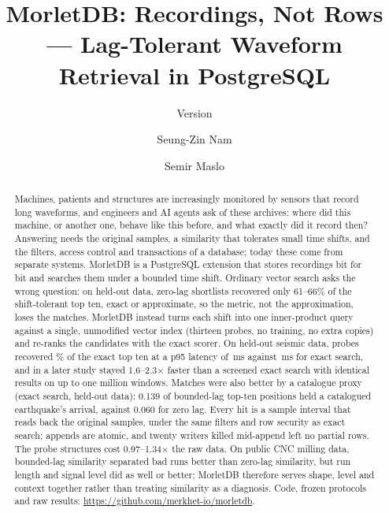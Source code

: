 \documentclass[sigconf]{acmart}
\begin{document}
\title{MorletDB: Recordings, Not Rows --- Lag-Tolerant Waveform Retrieval in PostgreSQL}
\ifdefined\SigmodSubmission\else\subtitle{Version \ReportVersion}\fi
\author{Seung-Zin Nam}
\author{Semir Maslo}

\begin{abstract}
Machines, patients and structures are increasingly monitored by sensors that record long waveforms, and engineers and AI agents ask of these archives: where did this machine, or another one, behave like this before, and what exactly did it record then? Answering needs the original samples, a similarity that tolerates small time shifts, and the filters, access control and transactions of a database; today these come from separate systems. MorletDB is a PostgreSQL extension that stores recordings bit for bit and searches them under a bounded time shift. Ordinary vector search asks the wrong question: on held-out data, zero-lag shortlists recovered only 61--66\% of the shift-tolerant top ten, exact or approximate, so the metric, not the approximation, loses the matches. MorletDB instead turns each shift into one inner-product query against a single, unmodified vector index (thirteen probes, no training, no extra copies) and re-ranks the candidates with the exact scorer. On held-out seismic data, probes recovered \EHoPctPR\% of the exact top ten at a p95 latency of \EHoPninetyfivePR\,ms against \EHoPninetyfiveExact\,ms for exact search, and in a later study stayed 1.6--2.3$\times$ faster than a screened exact search with identical results on up to one million windows. Matches were also better by a catalogue proxy (exact search, held-out data): 0.139 of bounded-lag top-ten positions held a catalogued earthquake's arrival, against 0.060 for zero lag. Every hit is a sample interval that reads back the original samples, under the same filters and row security as exact search; appends are atomic, and twenty writers killed mid-append left no partial rows. The probe structures cost 0.97--1.34$\times$ the raw data. On public CNC milling data, bounded-lag similarity separated bad runs better than zero-lag similarity, but run length and signal level did as well or better; MorletDB therefore serves shape, level and context together rather than treating similarity as a diagnosis. Code, frozen protocols and raw results: \mbox{\url{https://github.com/merkhet-io/morletdb}}.
\end{abstract}
\maketitle
\end{document}
